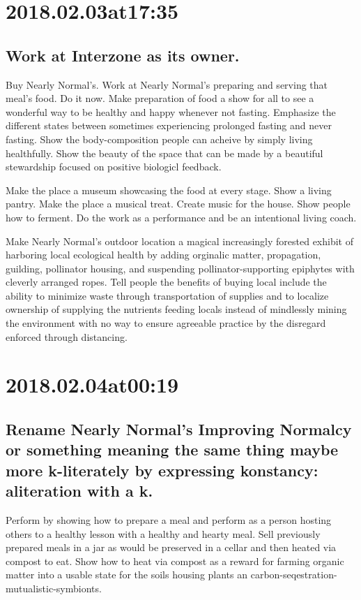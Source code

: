 \begin{enumerate}
\begin{enumerate}
\section*{ 2018.02.03at17:35 }
\subsection*{ Work at Interzone as its owner. }
Buy Nearly Normal's.
Work at Nearly Normal's preparing and serving that meal's food.
Do it now.
Make preparation of food a show for all to see a wonderful way to be healthy and happy whenever not fasting.
Emphasize the different states between sometimes experiencing prolonged fasting and never fasting. 
Show the body-composition people can acheive by simply living healthfully.
Show the beauty of the space that can be made by a beautiful stewardship focused on positive biologicl feedback.

Make the place a museum showcasing the food at every stage.
Show a living pantry.
Make the place a musical treat.
Create music for the house.
Show people how to ferment.
Do the work as a performance and be an intentional living coach.

Make Nearly Normal's outdoor location a magical increasingly forested exhibit of harboring local ecological health by adding orginalic matter, propagation, guilding, pollinator housing, and suspending pollinator-supporting epiphytes with cleverly arranged ropes.
Tell people the benefits of buying local include the ability to minimize waste through transportation of supplies and to localize ownership of supplying the nutrients feeding locals instead of mindlessly mining the environment with no way to ensure agreeable practice by the disregard enforced through distancing.

\section*{ 2018.02.04at00:19 }
\subsection*{ Rename Nearly Normal's Improving Normalcy or something meaning the same thing maybe more k-literately by expressing konstancy: aliteration with a k. }
Perform by showing how to prepare a meal and perform as a person hosting others to a healthy lesson with a healthy and hearty meal.
Sell previously prepared meals in a jar as would be preserved in a cellar and then heated via compost to eat.
Show how to heat via compost as a reward for farming organic matter into a usable state for the soils housing plants an carbon-seqestration-mutualistic-symbionts.


\end{enumerate}
\end{enumerate}

